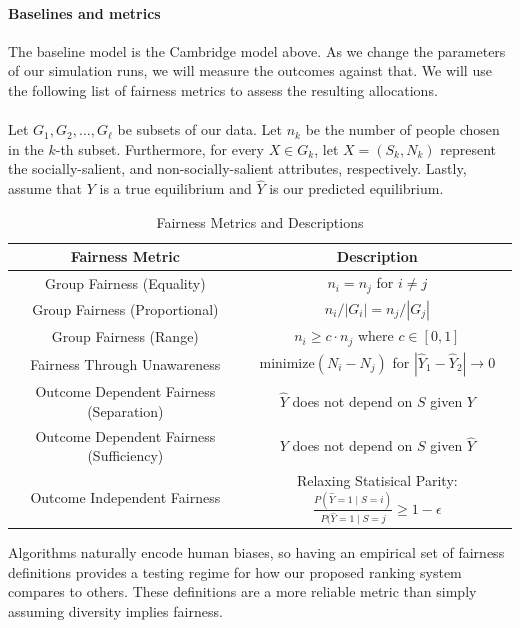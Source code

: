 \documentclass[11pt]{article}
\begin{document}
\paragraph{Baselines and metrics}
The baseline model is the Cambridge model above. As we change the parameters of our simulation runs, we will measure the outcomes against that. We will use the following list of fairness metrics to assess the resulting allocations. 
\\
\\
Let $G_1, G_2, \dots, G_\ell$ be subsets of our data. Let $n_k$ be the number of people chosen in the $k$-th subset. Furthermore, for every $X \in G_k$, let $X=(S_k, N_k)$ represent the socially-salient, and non-socially-salient attributes, respectively. Lastly, assume that $Y$ is a true equilibrium and $\hat{Y}$ is our predicted equilibrium.
\begin{table}[h]
    \centering
    \begin{tabular}{c|c}
        Fairness Metric & Description \\
        \hline
         Group Fairness (Equality) & $n_i = n_j$ for $i \neq j$ \\
         Group Fairness (Proportional) & $n_i / |G_i| = n_j / |G_j|$\\
         Group Fairness (Range) & $n_i \geq c \cdot n_j$ where $c \in [0,1]$ \\
         Fairness Through Unawareness & $\text{minimize}(N_i - N_j)$ for $|\hat{Y}_1 - \hat{Y}_2| \rightarrow 0$ \\
         Outcome Dependent Fairness (Separation) & $\hat{Y}$ does not depend on $S$ given $Y$ \\
         Outcome Dependent Fairness (Sufficiency) & $Y$ does not depend on $S$ given $\hat{Y}$ \\
         Outcome Independent Fairness & Relaxing Statisical Parity: $\frac{P(\hat{Y} = 1 \mid S = i)}{P(\hat{Y} = 1 \mid S = j} \geq 1 - \epsilon$ 
    \end{tabular}
    \caption{Fairness Metrics and Descriptions}
    \label{tab:fairness_metrics}
\end{table}
Algorithms naturally encode human biases, so having an empirical set of fairness definitions provides a testing regime for how our proposed ranking system compares to others. These definitions are a more reliable metric than simply assuming diversity implies fairness. 
\end{document}

